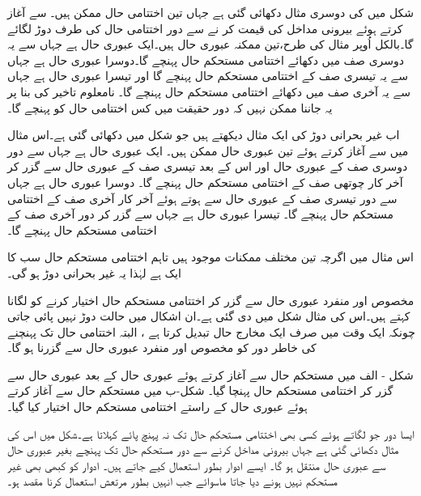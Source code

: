 شکل میں  کی دوسری مثال دکھائی گئی ہے جہاں تین اختتامی حال ممکن ہیں۔   سے آغاز کرتے ہوئے بیرونی مداخل  کی قیمت  کر نے سے دور اختتامی حال کی طرف دوڑ لگائے گا۔بالکل اُوپر مثال کی طرح،تین ممکنہ عبوری حال ہیں۔ایک عبوری حال  ہے جہاں سے یہ دوسری صف میں دکھائے اختتامی مستحکم حال  پہنچے گا۔دوسرا عبوری حال  ہے جہاں سے یہ تیسری صف کے اختتامی مستحکم حال  پہنچے گا اور تیسرا عبوری حال  ہے جہاں سے یہ آخری صف میں دکھائے اختتامی مستحکم حال  پہنچے گا۔ نامعلوم تاخیر کی بنا پر یہ جاننا ممکن نہیں کہ دور حقیقت میں کس اختتامی حال کو پہنچے گا۔

اب غیر بحرانی دوڑ کی ایک مثال دیکھتے ہیں جو شکل  میں دکھائی گئی ہے۔اس مثال میں  سے آغاز کرتے ہوئے تین عبوری حال ممکن ہیں۔ ایک عبوری حال  ہے جہاں سے دور دوسری صف کے عبوری حال  اور اس کے بعد تیسری صف کے عبوری حال  سے گزر کر آخر کار چوتھی صف کے اختتامی مستحکم حال  پہنچے گا۔ دوسرا عبوری حال  ہے جہاں سے دور تیسری صف کے عبوری حال  سے ہوتے ہوئے آخر کار آخری صف کے اختتامی مستحکم حال  پہنچے گا۔ تیسرا عبوری حال  ہے جہاں سے گزر کر دور آخری صف کے اختتامی مستحکم حال  پہنچے گا۔

اس مثال میں اگرچہ تین مختلف ممکنات موجود ہیں تاہم اختتامی مستحکم حال سب کا ایک ہے لہٰذا یہ غیر بحرانی دوڑ ہو گی۔ 

 مخصوص اور منفرد عبوری حال سے گزر کر اختتامی مستحکم حال اختیار کرنے کو  لگانا کہتے ہیں۔اس کی مثال شکل  میں دی گئی ہے۔ان اشکال میں حالت دوڑ نہیں پائی جاتی چونکہ ایک وقت میں صرف ایک مخارج حال تبدیل کرتا ہے ، البتہ اختتامی حال تک پہنچنے کی خاطر دور کو مخصوص اور منفرد عبوری حال سے گزرنا ہو گا۔

شکل - الف میں مستحکم حال  سے آغاز کرتے ہوئے عبوری حال  کے بعد عبوری حال  سے گزر کر اختتامی مستحکم حال  پہنچا گیا۔ شکل-ب میں مستحکم حال  سے آغاز کرتے ہوئے عبوری حال  کے راستے اختتامی مستحکم حال  اختیار کیا گیا۔


 ایسا دور جو  لگاتے ہوئے کسی بھی اختتامی مستحکم حال تک نہ پہنچ پائے  کہلاتا ہے۔شکل  میں اس کی مثال دکھائی گئی ہے جہاں بیرونی مداخل  کرنے سے دور مستحکم حال تک پہنچے بغیر عبوری حال سے عبوری حال منتقل ہو گا۔	ایسے ادوار بطور استعمال کیے جاتے ہیں۔ ادوار کو کبھی بھی غیر مستحکم نہیں ہونے دیا جاتا ماسوائے جب انہیں بطور مرتعش استعمال کرنا مقصد ہو۔

